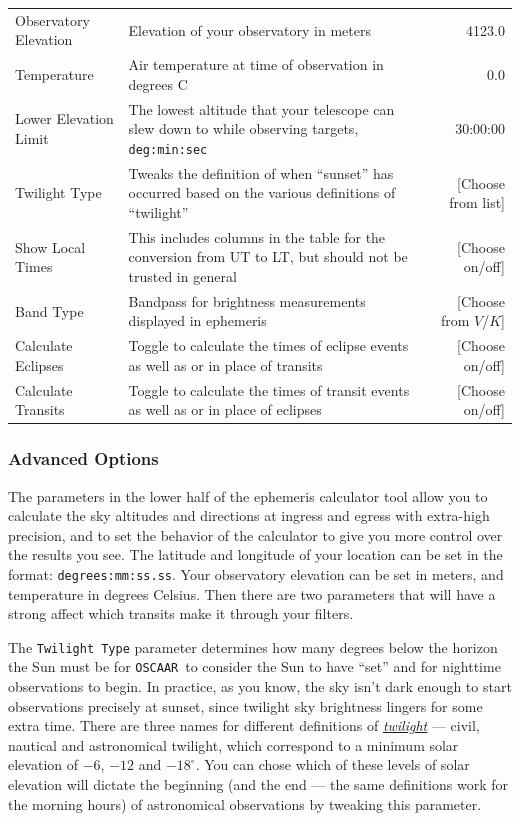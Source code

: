 \documentclass[a4paper]{article}
\newcommand{\code}[1]{\texttt{#1}}
\newcommand{\oscaar}{\code{OSCAAR}~}
\begin{document}
\begin{table}[H]
\begin{tabular}{p{0.8in} p{3.2in} r}
Observatory Elevation & Elevation of your observatory in meters & 4123.0 \\
Temperature & Air temperature at time of observation in degrees C & 0.0 \\
Lower Elevation Limit & The lowest altitude that your telescope can slew down to while observing targets, \code{deg:min:sec} & 30:00:00 \\
Twilight Type & Tweaks the definition of when ``sunset'' has occurred based on the various definitions of ``twilight'' & [Choose from list] \\
Show Local Times & This includes columns in the table for the conversion from UT to LT, but should not be trusted in general & [Choose on/off] \\
Band Type & Bandpass for brightness measurements displayed in ephemeris &  [Choose from $V$/$K$]\\
Calculate Eclipses & Toggle to calculate the times of eclipse events as well as or in place of transits &  [Choose on/off]\\
Calculate Transits & Toggle to calculate the times of transit events as well as or in place of eclipses &  [Choose on/off]\\
\hline 
\end{tabular}
\end{table}

\pagebreak

\subsubsection{Advanced Options}

The parameters in the lower half of the ephemeris calculator tool allow you to calculate the sky altitudes and directions at ingress and egress with extra-high precision, and to set the behavior of the calculator to give you more control over the results you see. The latitude and longitude of your location can be set in the format: \code{degrees:mm:ss.ss}. Your observatory elevation can be set in meters, and temperature in degrees Celsius. Then there are two parameters that will have a strong affect which transits make it through your filters. 

The \code{Twilight Type} parameter determines how many degrees below the horizon the Sun must be for \oscaar to consider the Sun to have ``set'' and for nighttime observations to begin. In practice, as you know, the sky isn't dark enough to start observations precisely at sunset, since twilight sky brightness lingers for some extra time. There are three names for different definitions of \href{http://en.wikipedia.org/wiki/Twilight#Definitions}{\textit{twilight}} --- civil, nautical and astronomical twilight, which correspond to a minimum solar elevation of $-6$, $-12$ and $-18^{\circ}$. You can chose which of these levels of solar elevation will dictate the beginning (and the end --- the same definitions work for the morning hours) of astronomical observations by tweaking this parameter. 
\end{document}
